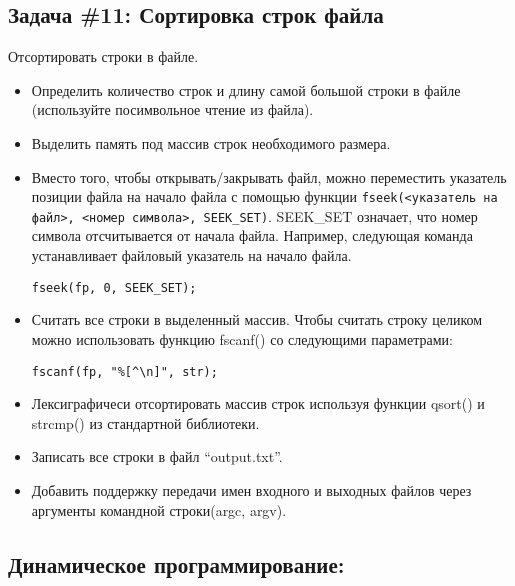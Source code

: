 \documentclass{article}
\begin{document}
\subsection*{\Squarepipe \quad Задача \#11: Сортировка строк файла}
Отсортировать строки в файле.
\begin{itemize}
\item Определить количество строк и длину самой большой строки в файле (используйте посимвольное чтение из файла).
\item Выделить память под массив строк необходимого размера.
\item Вместо того, чтобы открывать/закрывать файл, можно переместить указатель позиции файла на начало файла с помощью функции \texttt{fseek(<указатель на файл>, <номер символа>, \texttt{SEEK\_SET})}. SEEK\_SET означает, что номер символа отсчитывается от начала файла. Например, следующая команда устанавливает файловый указатель на начало файла.
\begin{lstlisting}
fseek(fp, 0, SEEK_SET);
\end{lstlisting}
\item Считать все строки в выделенный массив. Чтобы считать строку целиком можно использовать функцию fscanf() со следующими параметрами:
\begin{lstlisting}
fscanf(fp, "%[^\n]", str);
\end{lstlisting}
\item Лексиграфичеси отсортировать массив строк используя функции qsort() и strcmp() из стандартной библиотеки.
\item Записать все строки в файл ``output.txt''.
\item Добавить поддержку передачи имен входного и выходных файлов через аргументы командной строки(argc, argv).
\end{itemize}

\newpage
\subsection*{Динамическое программирование:}
\end{document}

